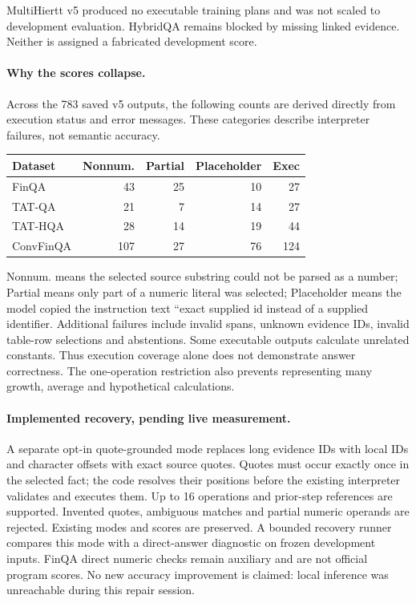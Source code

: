 MultiHiertt v5 produced no executable training plans and was not scaled to development evaluation. HybridQA remains blocked by missing linked evidence. Neither is assigned a fabricated development score.

\paragraph{Why the scores collapse.} Across the 783 saved v5 outputs, the following counts are derived directly from execution status and error messages. These categories describe interpreter failures, not semantic accuracy.

\begin{center}\small\setlength{\tabcolsep}{2pt}\begin{tabular}{lrrrr}

Dataset & Nonnum. & Partial & Placeholder & Exec\\\hline

FinQA & 43 & 25 & 10 & 27\\

TAT-QA & 21 & 7 & 14 & 27\\

TAT-HQA & 28 & 14 & 19 & 44\\

ConvFinQA & 107 & 27 & 76 & 124\\

\end{tabular}\end{center}

Nonnum. means the selected source substring could not be parsed as a number; Partial means only part of a numeric literal was selected; Placeholder means the model copied the instruction text ``exact supplied id instead of a supplied identifier. Additional failures include invalid spans, unknown evidence IDs, invalid table-row selections and abstentions. Some executable outputs calculate unrelated constants. Thus execution coverage alone does not demonstrate answer correctness. The one-operation restriction also prevents representing many growth, average and hypothetical calculations.

\paragraph{Implemented recovery, pending live measurement.} A separate opt-in quote-grounded mode replaces long evidence IDs with local IDs and character offsets with exact source quotes. Quotes must occur exactly once in the selected fact; the code resolves their positions before the existing interpreter validates and executes them. Up to 16 operations and prior-step references are supported. Invented quotes, ambiguous matches and partial numeric operands are rejected. Existing modes and scores are preserved. A bounded recovery runner compares this mode with a direct-answer diagnostic on frozen development inputs. FinQA direct numeric checks remain auxiliary and are not official program scores. No new accuracy improvement is claimed: local inference was unreachable during this repair session.
